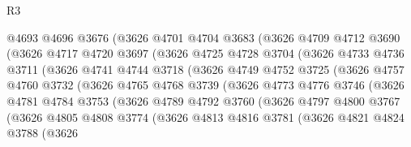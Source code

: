 \begin{lexlean}{R3}
\begin{coremodule}
                @4693
                @4696
                @3676
                (@3626
                  @4701
                  @4704
                  @3683
                  (@3626
                    @4709
                    @4712
                    @3690
                    (@3626
                      @4717
                      @4720
                      @3697
                      (@3626
                        @4725
                        @4728
                        @3704
                        (@3626
                          @4733
                          @4736
                          @3711
                          (@3626
                            @4741
                            @4744
                            @3718
                            (@3626
                              @4749
                              @4752
                              @3725
                              (@3626
                                @4757
                                @4760
                                @3732
                                (@3626
                                  @4765
                                  @4768
                                  @3739
                                  (@3626
                                    @4773
                                    @4776
                                    @3746
                                    (@3626
                                      @4781
                                      @4784
                                      @3753
                                      (@3626
                                        @4789
                                        @4792
                                        @3760
                                        (@3626
                                          @4797
                                          @4800
                                          @3767
                                          (@3626
                                            @4805
                                            @4808
                                            @3774
                                            (@3626
                                              @4813
                                              @4816
                                              @3781
                                              (@3626
                                                @4821
                                                @4824
                                                @3788
                                                (@3626

\end{coremodule}
\end{lexlean}
